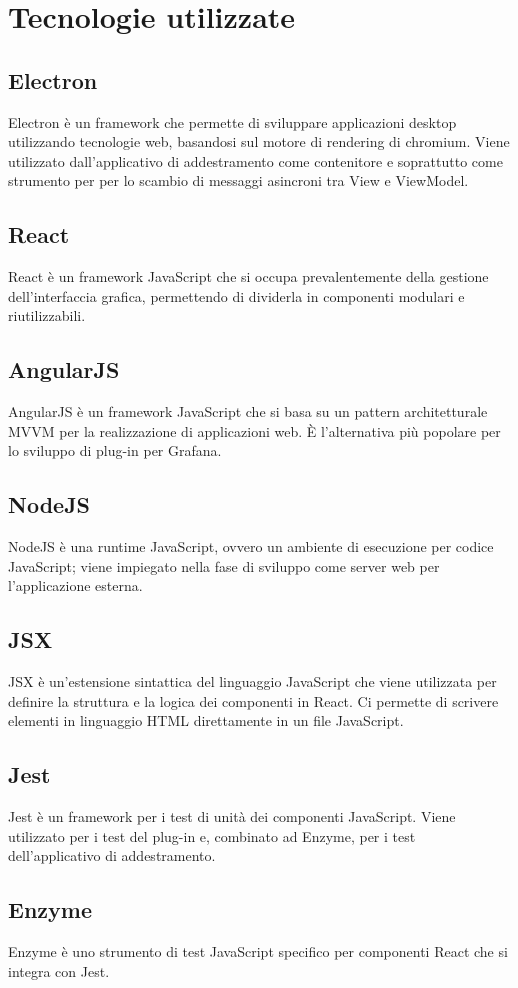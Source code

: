 \section{Tecnologie utilizzate}
	\subsection{Electron}
		Electron è un framework che permette di sviluppare applicazioni desktop utilizzando tecnologie web, basandosi sul motore di rendering di chromium. Viene utilizzato dall'applicativo di addestramento come contenitore e soprattutto come strumento per per lo scambio di messaggi asincroni tra View e ViewModel.
	\subsection{React}
		React è un framework JavaScript che si occupa prevalentemente della gestione dell'interfaccia grafica, permettendo di dividerla in componenti modulari e riutilizzabili.
	\subsection{AngularJS}
		AngularJS è un framework JavaScript che si basa su un pattern architetturale MVVM per la realizzazione di applicazioni web. È l'alternativa più popolare per lo sviluppo di plug-in per Grafana\glo.
	\subsection{NodeJS}
		NodeJS è una runtime JavaScript, ovvero un ambiente di esecuzione per codice JavaScript; viene impiegato nella fase di sviluppo come server web per l'applicazione esterna.
	\subsection{JSX}
		JSX è un'estensione sintattica del linguaggio JavaScript che viene utilizzata per definire la struttura e la logica dei componenti in React. Ci permette di scrivere elementi in linguaggio HTML direttamente in un file JavaScript.
	\subsection{Jest}
		Jest è un framework per i test di unità dei componenti JavaScript. Viene utilizzato per i test del plug-in e, combinato ad Enzyme, per i test dell'applicativo di addestramento.
	\subsection{Enzyme}
		Enzyme è uno strumento di test JavaScript specifico per componenti React che si integra con Jest.
